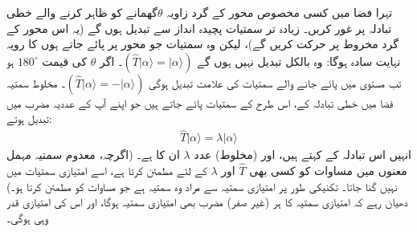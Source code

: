 تہرا فضا میں کسی مخصوص محور کے گرد زاویہ \(\theta\)گھمانے کو ظاہر کرنے والے خطی تبادلہ پر غور کریں۔ زیادہ تر سمتیات پچیدہ انداز سے تبدیل ہوں گے (یہ اس محور کے گرد مخروط پر حرکت کریں گے)،   لیکن وہ سمتیات جو  محور پر پائے جاتے ہوں کا رویہ نہایت سادہ ہوگا:  وہ بالکل تبدیل نہیں ہوں گے \((\hat{T}| \alpha \rangle=| \alpha \rangle)\)۔ اگر \(\theta\) کی قیمت \(\num{180}^\circ\) ہو تب  مستوی میں پائے جانے والے سمتیات کی علامت تبدیل ہوگی \((\hat{T}| \alpha \rangle = -| \alpha \rangle)\)۔ مخلوط سمتیہ فضا  میں  خطی تبادلہ کے،  اس طرح کے   سمتیات پائے جاتے ہیں جو اپنے آپ کے عددیہ مضرب میں تبدیل ہوتے:
\begin{align}\label{مساوات_ضمیمہ_مخصوص_سمتیات}
		\hat{T}|\alpha\rangle = \lambda|\alpha\rangle
\end{align}
انہیں اس تبادلہ کے    کہتے ہیں،  اور  (مخلوط)  عدد \(\lambda\) ان کا   ہے۔ (اگرچہ، معدوم سمتیہ مہمل  معنوں میں مساوات   کو کسی بھی \(\hat{T}\) اور \(\lambda\) کے لئے مطمئن کرتا ہے،  اسے امتیازی سمتیات میں نہیں گنا جاتا۔ تکنیکی طور پر  امتیازی سمتیہ سے مراد وہ   سمتیہ ہے جو مساوات  کو  مطمئن کرتا ہو۔)  دھیان رہے کہ امتیازی سمتیہ کا ہر   (غیر صفر)  مضرب بھی امتیازی سمتیہ ہوگا،  اور اس  کی امتیازی قدر وہی ہوگی۔

